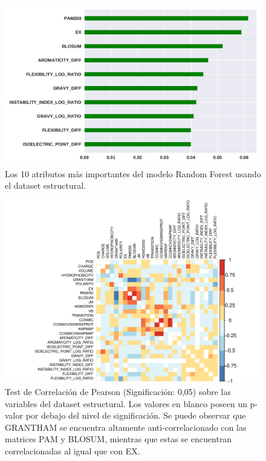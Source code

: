 \begin{figure}[H]
    \centering
    \includegraphics[scale=0.55]{documents/latex/figures/3/importance_1.pdf}
    \caption{Los 10 atributos más importantes del modelo Random Forest usando el dataset estructural. }
    \label{fig:importance_1}
\end{figure}


\begin{figure}[H]
    \centering
    \includegraphics[scale=0.8]{documents/latex/figures/3/corrplot_1.pdf}
    \caption{Test de Correlación de Pearson (Significación: 0,05) sobre las variables del dataset estructural. Los valores en blanco poseen un p-valor por debajo del nivel de significación. Se puede observar que GRANTHAM se encuentra altamente anti-correlacionado con las matrices PAM y BLOSUM, mientras que estas se encuentran correlacionadas al igual que con EX.}
    \label{fig:corrplot_1}
\end{figure}

